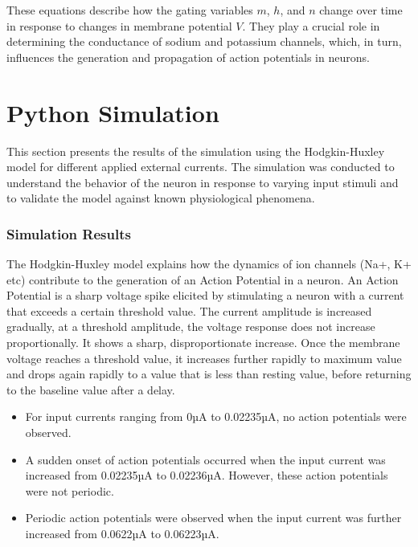 \documentclass[12pt,a4paper]{report}
\begin{document}
These equations describe how the gating variables $m$, $h$, and $n$ change over time in response to changes in membrane potential $V$. They play a crucial role in determining the conductance of sodium and potassium channels, which, in turn, influences the generation and propagation of action potentials in neurons\cite{Hodgkin1952}.


\section{Python Simulation}

This section presents the results of the simulation using the Hodgkin-Huxley model for different applied external currents. The simulation was conducted to understand the behavior of the neuron in response to varying input stimuli and to validate the model against known physiological phenomena.

\subsubsection{Simulation Results}
The Hodgkin-Huxley model explains how the dynamics of ion channels (Na+, K+ etc) contribute to the generation of an Action Potential in a neuron.
An Action Potential is a sharp voltage spike elicited by stimulating a neuron with a current
that exceeds a certain threshold value. The current amplitude is increased gradually, at a
threshold amplitude, the voltage response does not increase proportionally.
It shows a sharp, disproportionate increase.
Once the membrane voltage reaches a threshold value, it increases further rapidly to maximum value and drops again rapidly to a value that is less than resting value, before returning
to the baseline value after a delay.


\begin{itemize}
  \item For input currents ranging from 0µA to 0.02235µA, no action potentials were observed.
\end{itemize}

\begin{itemize}
  \item A sudden onset of action potentials occurred when the input current was increased from 0.02235µA to 0.02236µA. However, these action potentials were not periodic.
\end{itemize}

\begin{itemize}
  \item Periodic action potentials were observed when the input current was further increased from 0.0622µA to 0.06223µA.
\end{itemize}
\end{document}
